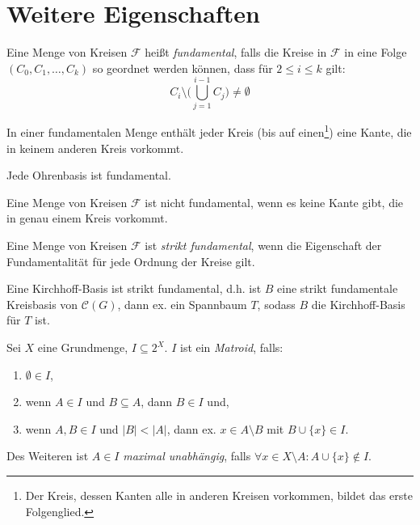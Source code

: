\section{Weitere Eigenschaften}

\begin{definition}[Fundamental]
    Eine Menge von Kreisen $ \mathcal{F} $ heißt \textit{fundamental}, falls die Kreise in $ \mathcal{F} $ in eine Folge $ (C_0, C_1, \dots, C_k) $ so geordnet werden können, dass für $ 2 \leq i \leq k $ gilt:
    \begin{equation*}
        C_i \setminus \big(\bigcup^{i-1}_{j=1} C_j \big) \ne \emptyset
    \end{equation*}
\end{definition}

\begin{remark}
    In einer fundamentalen Menge enthält jeder Kreis (bis auf einen\footnote{%
        Der Kreis, dessen Kanten alle in anderen Kreisen vorkommen, bildet das erste Folgenglied.
    }) eine Kante, die in keinem anderen Kreis vorkommt.
\end{remark}

\begin{proposition}
    Jede Ohrenbasis ist fundamental.
\end{proposition}

\begin{lemma}
    Eine Menge von Kreisen $ \mathcal{F} $ ist nicht fundamental, wenn es keine Kante gibt, die in genau einem Kreis vorkommt.
\end{lemma}

\begin{definition}
    Eine Menge von Kreisen $ \mathcal{F} $ ist \textit{strikt fundamental}, wenn die Eigenschaft der Fundamentalität für jede Ordnung der Kreise gilt.
\end{definition}

\begin{proposition}
    Eine Kirchhoff-Basis ist strikt fundamental, d.h. ist $ B $ eine strikt fundamentale Kreisbasis von $ \mathcal{C}(G) $, dann ex. ein Spannbaum $ T $, sodass $ B $ die Kirchhoff-Basis für $ T $ ist.
\end{proposition}

\begin{definition}[Matroid]
    Sei $ X $ eine Grundmenge, $ I \subseteq 2^X $.
    $ I $ ist ein \textit{Matroid}, falls:
    \begin{enumerate}
        \item $ \emptyset \in I $,
        \item wenn $ A \in I $ und $ B \subseteq A $, dann $ B \in I $ und,
        \item wenn $ A, B \in I $ und $ |B| < |A| $, dann ex. $ x \in A \setminus B $ mit $ B \cup \{ x \} \in I $.
    \end{enumerate}

    Des Weiteren ist $ A \in I $ \textit{maximal unabhängig}, falls $ \forall x \in X \setminus A: A \cup \{ x \} \notin I $.
\end{definition}

